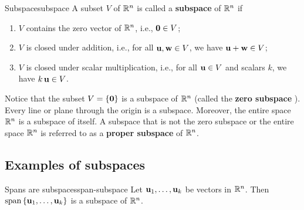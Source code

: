 \begin{definition}{Subspace}{subspace}
  A subset $V$ of\/ $\mathbb{R}^n$ is called a \textbf{subspace}%
   of $\mathbb{R}^n$ if
  \begin{enumerate}
  \item $V$ contains the zero vector of\/ $\mathbb{R}^n$, i.e., $\mbox{\bf 0}\in V$;
  \item $V$ is closed under addition, i.e., for all\/
    $\mbox{\bf u},\mbox{\bf w}\in V$, we have $\mbox{\bf u}+\mbox{\bf w}\in V$;
  \item $V$ is closed under scalar multiplication, i.e., for all\/
    $\mbox{\bf u}\in V$ and scalars $k$, we have\/ $k\,\mbox{\bf u}\in V$.
  \end{enumerate}
\end{definition}

Notice that the subset $V = \left\{\mbox{\bf 0}\right\}$ is a subspace of $\mathbb{R}^n$
(called the \textbf{zero subspace}%
). Every line or plane through the
origin is a subspace. Moreover, the entire space $\mathbb{R}^n$ is a subspace
of itself. A subspace that is not the zero subspace or the entire
space $\mathbb{R}^n$ is referred to as a \textbf{proper subspace}%
 of $\mathbb{R}^n$.

\subsection{Examples of subspaces}

\begin{proposition}{Spans are subspaces}{span-subspace}
  Let $\mbox{\bf u}_1,\ldots,\mbox{\bf u}_k$ be vectors in $\mathbb{R}^{n}$. Then
  $\sspan\set{\vect{u}_1,\ldots,\vect{u}_k}$ is a subspace of
  $\mathbb{R}^{n}$.%
\end{proposition}

